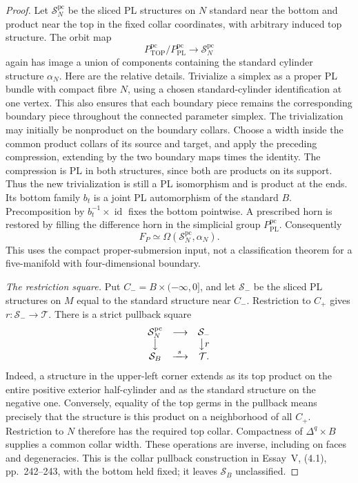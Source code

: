 \begin{proof}
Let $\mathcal S_N^{\mathrm{pc}}$ be the sliced PL structures on $N$
standard near the bottom and product near the top in the fixed
collar coordinates, with arbitrary induced top structure.  The
orbit map
\[
 P_{\mathrm{TOP}}^{\mathrm{pc}}/
 P_{\mathrm{PL}}^{\mathrm{pc}}\longrightarrow
 \mathcal S_N^{\mathrm{pc}}
\]
again has image a union of components containing the standard
cylinder structure $\alpha_N$.  Here are the relative details.
Trivialize a simplex as a proper PL bundle with compact fibre $N$,
using a chosen standard-cylinder identification at one vertex.
This also ensures that each boundary piece remains the corresponding
boundary piece throughout the connected parameter simplex.  The
trivialization may initially be nonproduct on the boundary collars.
Choose a width inside the common product collars of its source and
target, and apply the preceding compression, extending by the two
boundary maps times the identity.  The compression is PL in both
structures, since both are products on its support.  Thus the new
trivialization is still a PL isomorphism and is product at the ends.
Its bottom family $b_t$ is a joint PL automorphism of the standard
$B$.  Precomposition by $b_t^{-1}\times\operatorname{id}$ fixes the
bottom pointwise.  A prescribed horn is restored by filling the
difference horn in the simplicial group
$P_{\mathrm{PL}}^{\mathrm{pc}}$.  Consequently
\begin{equation}\label{eq:compact-cylinder-orbit-loop}
 F_P\simeq\Omega(\mathcal S_N^{\mathrm{pc}},\alpha_N).
\end{equation}
This uses the compact proper-submersion input, not a classification
theorem for a five-manifold with four-dimensional boundary.

\emph{The restriction square.}
Put $C_-=B\times(-\infty,0]$, and let $\mathcal S_-$ be the sliced
PL structures on $M$ equal to the standard structure near $C_-$.
Restriction to $C_+$ gives $r:\mathcal S_-\to\mathcal T$.
There is a strict pullback square
\begin{equation}\label{eq:four-dimensional-collar-pullback}
\begin{array}{ccc}
 \mathcal S_N^{\mathrm{pc}}&\longrightarrow&\mathcal S_-\\
 \big\downarrow&&\big\downarrow r\\
 \mathcal S_B&\xrightarrow{\ s\ }&\mathcal T.
\end{array}
\end{equation}
Indeed, a structure in the upper-left corner extends as its top
product on the entire positive exterior half-cylinder and as the
standard structure on the negative one.  Conversely, equality of
the top germs in the pullback means precisely that the structure
is this product on a neighborhood of all $C_+$.  Restriction to $N$
therefore has the required top collar.  Compactness of
$\Delta^q\times B$ supplies a common collar width.  These operations
are inverse, including on faces and degeneracies.  This is the
collar pullback construction in Essay~V, (4.1), pp.~242--243, with
the bottom held fixed; it leaves $\mathcal S_B$ unclassified.


\end{proof}
